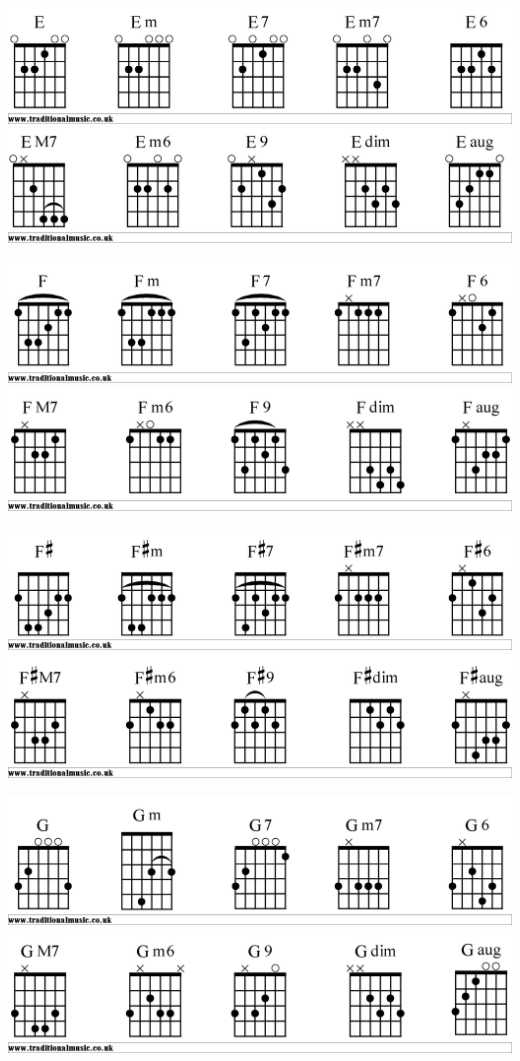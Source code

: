\includegraphics[scale=.15]{chords/Egtr1}
\includegraphics[scale=.15]{chords/Egtr2}

\includegraphics[scale=.15]{chords/Fgtr1}
\includegraphics[scale=.15]{chords/Fgtr2}

\includegraphics[scale=.15]{chords/Fsgtr1}
\includegraphics[scale=.15]{chords/Fsgtr2}

\includegraphics[scale=.15]{chords/Ggtr1}
\includegraphics[scale=.15]{chords/Ggtr2}

